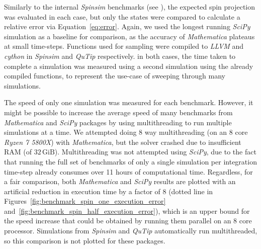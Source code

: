 \documentclass{jors}
\begin{document}
		Similarly to the internal \emph{Spinsim} benchmarks (see \emph{}), the expected spin projection was evaluated in each case, but only the states were compared to calculate a relative error via Equation~\eqref{eq:error}.
		Again, we used the longest running \emph{SciPy} simulation as a baseline for comparison, as the accuracy of \emph{Mathematica} plateaus at small time-steps.
		Functions used for sampling were compiled to \emph{LLVM} and \emph{cython} in \emph{Spinsim} and \emph{QuTip} respectively.
		in both cases, the time taken to complete a simulation was measured using a second simulation using the already compiled functions, to represent the use-case of sweeping through many simulations.

		The speed of only one simulation was measured for each benchmark.
		However, it might be possible to increase the average speed of many benchmarks from \emph{Mathematica} and \emph{SciPy} packages by using multithreading to run multiple simulations at a time.
		We attempted doing 8 way multithreading (on an 8 core \emph{Ryzen 7 5800X}) with \emph{Mathematica}, but the solver crashed due to insufficient RAM (of $ 32\,\text{GiB} $).
		Multithreading was not attempted using \emph{SciPy}, due to the fact that running the full set of benchmarks of only a single simulation per integration time-step already consumes over 11 hours of computational time.
		Regardless, for a fair comparison, both \emph{Mathematica} and \emph{SciPy} results are plotted with an artificial reduction in execution time by a factor of 8 (dotted line in Figures~\ref{fig:benchmark_spin_one_execution_error} and~\ref{fig:benchmark_spin_half_execution_error}), which is an upper bound for the speed increase that could be obtained by running them parallel on an 8 core processor.
		Simulations from \emph{Spinsim} and \emph{QuTip} automatically run multithreaded, so this comparison is not plotted for these packages.
\end{document}
